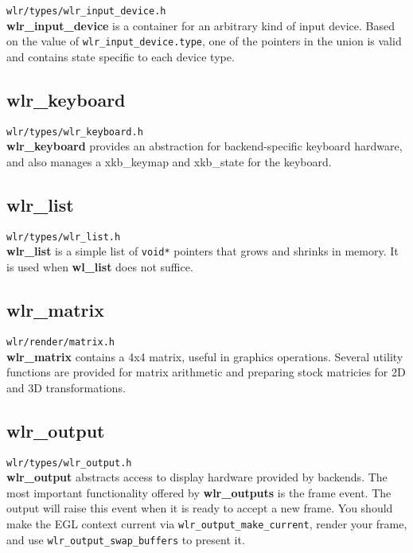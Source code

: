 \documentclass{article}
\newcommand{\code}[1]{\texttt{#1}}
\begin{document}
\code{wlr/types/wlr_input_device.h}\\

\textbf{wlr_input_device} is a container for an arbitrary kind of input device.
Based on the value of \code{wlr_input_device.type}, one of the pointers in the
union is valid and contains state specific to each device type.

\subsection{wlr_keyboard}\label{wlr keyboard}

\code{wlr/types/wlr_keyboard.h}\\

\textbf{wlr_keyboard} provides an abstraction for backend-specific keyboard
hardware, and also manages a xkb_keymap and xkb_state for the keyboard.

\subsection{wlr_list}\label{wlr list}

\code{wlr/types/wlr_list.h}\\

\textbf{wlr_list} is a simple list of \code{void*} pointers that grows and
shrinks in memory. It is used when \textbf{wl_list} does not suffice.

\subsection{wlr_matrix}\label{wlr matrix}

\code{wlr/render/matrix.h}\\

\textbf{wlr_matrix} contains a 4x4 matrix, useful in graphics operations.
Several utility functions are provided for matrix arithmetic and preparing stock
matricies for 2D and 3D transformations.

\subsection{wlr_output}\label{wlr output}

\code{wlr/types/wlr_output.h}\\

\textbf{wlr_output} abstracts access to display hardware provided by backends.
The most important functionality offered by \textbf{wlr_outputs} is the frame
event. The output will raise this event when it is ready to accept a new frame.
You should make the EGL context current via \code{wlr_output_make_current},
render your frame, and use \code{wlr_output_swap_buffers} to present it.\\
\end{document}
